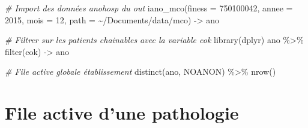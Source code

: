 \documentclass[
]{book}
\newenvironment{Shaded}{\begin{snugshade}}{\end{snugshade}}
\newcommand{\AttributeTok}[1]{\textcolor[rgb]{0.77,0.63,0.00}{#1}}
\newcommand{\CommentTok}[1]{\textcolor[rgb]{0.56,0.35,0.01}{\textit{#1}}}
\newcommand{\DecValTok}[1]{\textcolor[rgb]{0.00,0.00,0.81}{#1}}
\newcommand{\FunctionTok}[1]{\textcolor[rgb]{0.00,0.00,0.00}{#1}}
\newcommand{\NormalTok}[1]{#1}
\newcommand{\OtherTok}[1]{\textcolor[rgb]{0.56,0.35,0.01}{#1}}
\newcommand{\SpecialCharTok}[1]{\textcolor[rgb]{0.00,0.00,0.00}{#1}}
\newcommand{\StringTok}[1]{\textcolor[rgb]{0.31,0.60,0.02}{#1}}
\begin{document}
\begin{Shaded}
\begin{Highlighting}[]
\CommentTok{\# Import des données anohosp du out}
\FunctionTok{iano\_mco}\NormalTok{(}\AttributeTok{finess =} \DecValTok{750100042}\NormalTok{, }
         \AttributeTok{annee =} \DecValTok{2015}\NormalTok{,}
         \AttributeTok{mois =} \DecValTok{12}\NormalTok{,}
         \AttributeTok{path =} \StringTok{\textquotesingle{}\textasciitilde{}/Documents/data/mco\textquotesingle{}}\NormalTok{) }\OtherTok{{-}\textgreater{}}\NormalTok{ ano}

\CommentTok{\# Filtrer sur les patients chainables avec la variable cok}
\FunctionTok{library}\NormalTok{(dplyr)}
\NormalTok{ano }\SpecialCharTok{\%\textgreater{}\%} \FunctionTok{filter}\NormalTok{(cok) }\OtherTok{{-}\textgreater{}}\NormalTok{ ano}

\CommentTok{\# File active globale établissement}
\FunctionTok{distinct}\NormalTok{(ano, NOANON) }\SpecialCharTok{\%\textgreater{}\%} \FunctionTok{nrow}\NormalTok{()}
\end{Highlighting}
\end{Shaded}

\hypertarget{file-active-dune-pathologie}{%
\section{File active d'une pathologie}\label{file-active-dune-pathologie}}

\begin{Shaded}
\end{Shaded}
\end{document}
